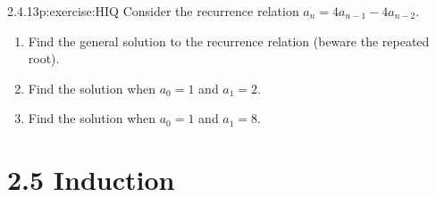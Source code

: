 \documentclass[twoside,11pt,]{book}
\numberwithin{equation}{chapter}
\begin{document}
\begin{divisionsolution}{2.4.13}{}{p:exercise:HIQ}%
Consider the recurrence relation \(a_n = 4a_{n-1} - 4a_{n-2}\).%
\begin{enumerate}[label=(\alph*)]
\item{}Find the general solution to the recurrence relation (beware the repeated root).%
\item{}Find the solution when \(a_0 = 1\) and \(a_1 = 2\). %
\item{}Find the solution when \(a_0 = 1\) and \(a_1 = 8\). %
\end{enumerate}
%
\end{divisionsolution}%
\section*{2.5 Induction}
\end{document}
